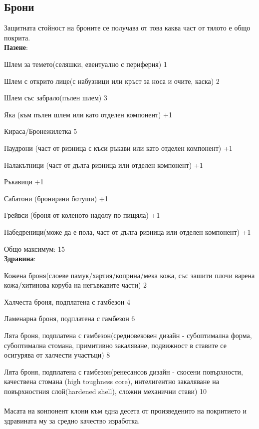 \subsection{Брони}
Защитната стойност на броните се получава от това каква част от тялото е общо покрита.
\\
\textbf{Пазене}:
\begin{itemize*}
\item{Шлем за темето(селяшки, евентуално с периферия) 1}
\item{Шлем с открито лице(с набузници или кръст за носа и очите, каска) 2}
\item{Шлем със забрало(пълен шлем) 3}
\item{Яка (към пълен шлем или като отделен компонент) +1}

\item{Кираса/Бронежилетка 5}

\item{Паудрони (част от ризница с къси ръкави или като отделен компонент) +1}
\item{Налакътници (част от дълга ризница или отделен компонент) +1}
\item{Ръкавици +1}

\item{Сабатони (бронирани ботуши) +1}
\item{Грейвси (броня от коленото надолу по пищяла) +1}
\item{Набедреници(може да е пола, част от дълга ризница или отделен компонент) +1}
\end{itemize*}

Общо максимум: 15
\\
\textbf{Здравина}:
\begin{itemize*}
\item{Кожена броня(слоеве памук/хартия/коприна/мека кожа, със зашити плочи варена кожа/хитинова коруба на негъвкавите части) 2}
\item{Халчеста броня, подплатена с гамбезон 4}
\item{Ламенарна броня, подплатена с гамбезон 6}
\item{Лята броня, подплатена с гамбезон(средновековен дизайн - субоптимална форма, субоптимална стомана, примитивно закаляване, подвижност в ставите се осигурява от халчести участъци) 8}
\item{Лята броня, подплатена с гамбезон(ренесансов дизайн - скосени повърхности, качествена стомана (high toughness core),  интелигентно закаляване на повърхностния слой(hardened shell), сложни механични стави) 10}
\\
\\
Масата на конпонент клони към една десета от произведенито на покритието и здравината му за средно качество изработка.
\end{itemize*}

